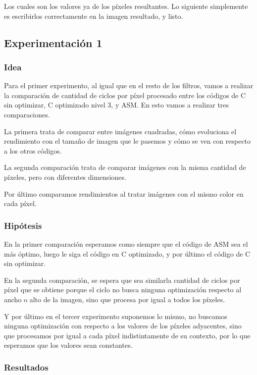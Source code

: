 \par{Los cuales son los valores ya de los píxeles resultantes. Lo siguiente simplemente es escribirlos correctamente en la imagen resultado, y listo.}


\subsection{Experimentación 1}

\subsubsection{Idea}
\par{Para el primer experimento, al igual que en el resto de los filtros, vamos a realizar la comparación de cantidad de ciclos por píxel procesado entre los códigos de C sin optimizar, C optimizado nivel 3, y ASM. En esto vamos a realizar tres comparaciones.}
\par{La primera trata de comparar entre imágenes cuadradas, cómo evoluciona el rendimiento con el tamaño de imagen que le pasemos y cómo se ven con respecto a los otros códigos.}
\par{La segunda comparación trata de comparar imágenes con la misma cantidad de píxeles, pero con diferentes dimensiones.}
\par{Por último comparamos rendimientos al tratar imágenes con el mismo color en cada píxel.}
	
\subsubsection{Hipótesis}
\par{En la primer comparación esperamos como siempre que el código de ASM sea el más óptimo, luego le siga el código en C optimizado, y por último el código de C sin optimizar.}
\par{En la segunda comparación, se espera que sea similarla cantidad de ciclos por píxel que se obtiene porque el ciclo no busca ninguna optimización respecto al ancho o alto de la imagen, sino que procesa por igual a todos los píxeles.}
\par{Y por último en el tercer experimento suponemos lo mismo, no buscamos ninguna optimización con respecto a los valores de los píxeles adyacentes, sino que procesamos por igual a cada píxel indistintamente de su contexto, por lo que esperamos que los valores sean constantes.}

\subsubsection{Resultados}


